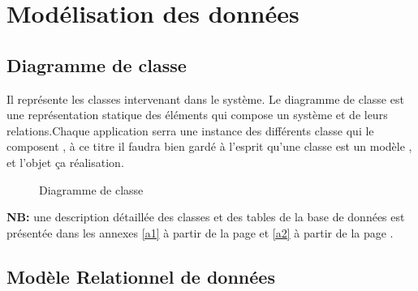 \documentclass{report}
\begin{document}
\newpage
\section{Modélisation des données}
\subsection{Diagramme de classe}
Il représente les classes intervenant dans le système. Le diagramme de classe est une représentation statique des éléments qui compose un système et de leurs relations.Chaque application serra une instance des différents classe qui le composent , à ce titre il faudra bien gardé à l'esprit qu'une classe est un modèle , et l'objet ça réalisation.
\\
    \begin{figure}[h]
        \centering
        \caption{Diagramme de classe}
    \end{figure}

\textbf{NB:} une description détaillée des classes et des tables de la base de données est présentée dans les annexes \ref{a1} à partir de la page \pageref{a1} et \ref{a2} à partir de la page \pageref{a2}.
\newpage
\subsection{Modèle Relationnel de données}
\end{document}
